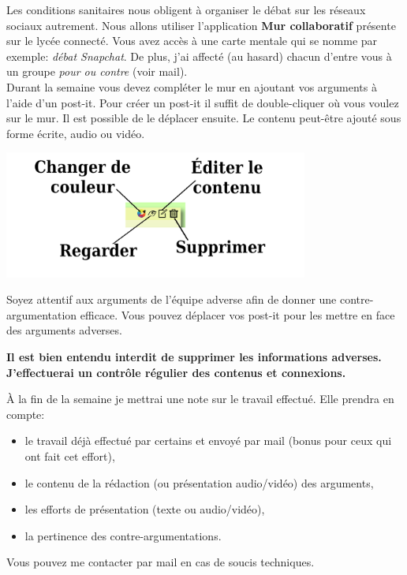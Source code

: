 \documentclass[a4paper,11pt]{article}
\begin{document}
Les conditions sanitaires nous obligent à organiser le débat sur les réseaux sociaux autrement. Nous allons utiliser l'application \textbf{Mur collaboratif} présente sur le lycée connecté. Vous avez accès à une carte mentale qui se nomme par exemple: \emph{débat Snapchat}. De plus, j'ai affecté (au hasard) chacun d'entre vous à un groupe \emph{pour ou contre} (voir mail).\\
Durant la semaine vous devez compléter le mur en ajoutant vos arguments à l'aide d'un post-it. Pour créer un post-it il suffit de double-cliquer où vous voulez sur le mur. Il est possible de le déplacer ensuite. Le contenu peut-être ajouté sous forme écrite, audio ou vidéo.
\begin{center}
\centering
\includegraphics[width=10cm]{ressources/post-it.png}
\label{postit}
\end{center}
Soyez attentif aux arguments de l'équipe adverse afin de donner une contre-argumentation efficace. Vous pouvez déplacer vos post-it pour les mettre en face des arguments adverses.

\textbf{Il est bien entendu interdit de supprimer les informations adverses. J'effectuerai un contrôle régulier des contenus et connexions.}

À la fin de la semaine je mettrai une note sur le travail effectué. Elle prendra en compte:
\begin{itemize}
    \item le travail déjà effectué par certains et envoyé par mail (bonus pour ceux qui ont fait cet effort),
    \item le contenu de la rédaction (ou présentation audio/vidéo) des arguments,
    \item les efforts de présentation (texte ou audio/vidéo),
    \item la pertinence des contre-argumentations.
\end{itemize}

Vous pouvez me contacter par mail en cas de soucis techniques.
\end{document}
